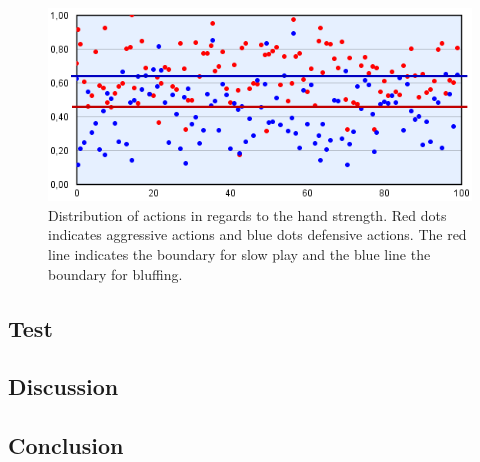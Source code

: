 \begin{figure}[H]
  \center
    \includegraphics[scale=0.775]{images/modeling/action-dist.png}
  \caption{Distribution of actions in regards to the hand strength. Red dots indicates aggressive actions and blue dots defensive actions. The red line indicates the boundary for slow play and the blue line the boundary for bluffing. \label{fig:dist-act}}
\end{figure}





\subsection{Test}


\subsection{Discussion}

\subsection{Conclusion}

